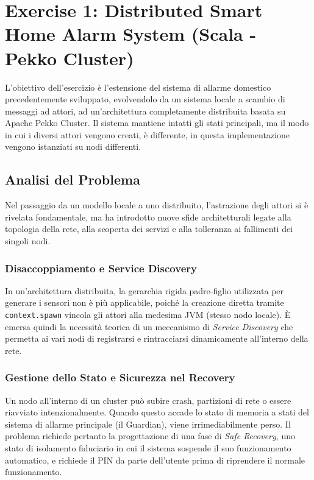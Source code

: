 \section{Exercise 1: Distributed Smart Home Alarm System (Scala - Pekko Cluster)}
L'obiettivo dell'esercizio è l'estensione del sistema di allarme domestico precedentemente sviluppato, evolvendolo da un sistema locale a scambio di messaggi ad attori, ad un'architettura completamente distribuita basata su Apache Pekko Cluster. Il sistema mantiene intatti gli stati principali, ma il modo in cui i diversi attori vengono creati, è differente, in questa implementazione vengono istanziati su nodi differenti.

\subsection{Analisi del Problema}
Nel passaggio da un modello locale a uno distribuito, l'astrazione degli attori si è rivelata fondamentale, ma ha introdotto nuove sfide architetturali legate alla topologia della rete, alla scoperta dei servizi e alla tolleranza ai fallimenti dei singoli nodi.

\subsubsection{Disaccoppiamento e Service Discovery}
In un'architettura distribuita, la gerarchia rigida padre-figlio utilizzata per generare i sensori non è più applicabile, poiché la creazione diretta tramite \texttt{context.spawn} vincola gli attori alla medesima JVM (stesso nodo locale). È emersa quindi la necessità teorica di un meccanismo di \textit{Service Discovery} che permetta ai vari nodi di registrarsi e rintracciarsi dinamicamente all'interno della rete.

\subsubsection{Gestione dello Stato e Sicurezza nel Recovery}
Un nodo all'interno di un cluster può subire crash, partizioni di rete o essere riavviato intenzionalmente. Quando questo accade lo stato di memoria a stati del sistema di allarme principale (il Guardian), viene irrimediabilmente perso. 
Il problema richiede pertanto la progettazione di una fase di \emph{Safe Recovery}, uno stato di isolamento fiduciario in cui il sistema sospende il suo funzionamento automatico, e richiede il PIN da parte dell'utente prima di riprendere il normale funzionamento.

